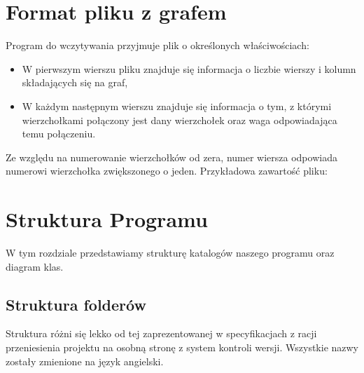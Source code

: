 \documentclass[10pt, a4paper]{report}
\begin{document}
\section{Format pliku z grafem}\label{sec:format-pliku-z-grafem}
Program do wczytywania przyjmuje plik o określonych
właściwościach:
\begin{itemize}
  \item W pierwszym wierszu pliku znajduje się informacja o liczbie wierszy i
        kolumn składających się na graf,
  \item W każdym następnym wierszu znajduje się informacja o tym, z którymi
        wierzchołkami połączony jest dany wierzchołek oraz waga odpowiadająca
        temu połączeniu.
\end{itemize}
Ze względu na numerowanie wierzchołków od zera, numer wiersza odpowiada
numerowi wierzchołka zwiększonego o jeden.
Przykładowa zawartość pliku:


\section{Struktura Programu}\label{sec:struktura-programu}
W tym rozdziale przedstawiamy strukturę katalogów naszego programu oraz diagram
klas.

\subsection{Struktura folderów}\label{subsec:struktura-folderów}
Struktura różni się lekko od tej zaprezentowanej w specyfikacjach z racji
przeniesienia projektu na osobną stronę
z system kontroli wersji. Wszystkie nazwy zostały zmienione na język angielski.
\end{document}
